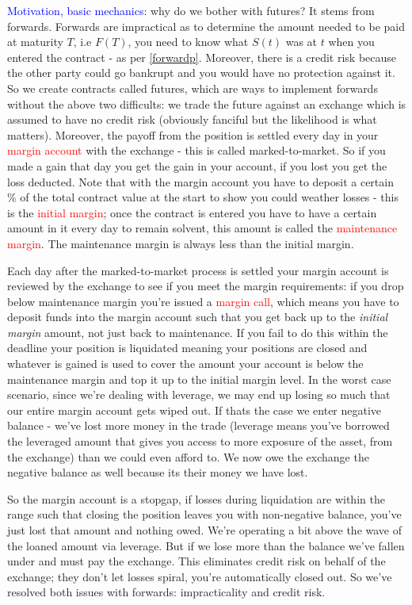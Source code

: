 \documentclass[9pt]{extarticle}
\begin{document}
\textcolor{blue}{Motivation, basic mechanics}: why do we bother with futures? It stems from forwards. Forwards are impractical as to determine the amount needed 
to be paid at maturity $T$, i.e $F(T)$, you need to know what $S(t)$ was at $t$ when you entered the contract - as per \eqref{forwardp}. Moreover, 
there is a credit risk because the other party could go bankrupt and you would have no protection against it. So we create contracts called 
futures, which are ways to implement forwards without the above two difficults: we trade the future against an exchange which is assumed to 
have no credit risk (obviously fanciful but the likelihood is what matters). Moreover, the payoff from the position is settled every day 
in your \textcolor{red}{margin account} with the exchange - this is called marked-to-market. So if you made a gain that day you get the gain in your account, if you lost 
you get the loss deducted. Note that with the margin account you have to deposit a certain \% of the total contract value 
at the start to show you could weather losses - this is the \textcolor{red}{initial margin}; once the contract is entered you have to have a certain amount in it 
every day to remain solvent, this amount is called the \textcolor{red}{maintenance margin}. The maintenance margin is always less than 
the initial margin. 

Each day after the marked-to-market process is settled your margin account is reviewed by the exchange to see 
if you meet the margin requirements: if you drop below maintenance margin you're issued a \textcolor{red}{margin call}, which means 
you have to deposit funds into the margin account such that you get back up to the \textit{initial margin} amount, not just 
back to maintenance. If you fail to do this within the deadline your position is liquidated meaning your positions are closed 
and whatever is gained is used to cover the amount your account is below the maintenance margin and top it up to the initial margin level. In the worst case scenario, since 
we're dealing with leverage, 
we may end up losing so much that our entire margin account gets wiped out. If thats the case we enter negative balance - we've lost more money in the trade (leverage means 
you've borrowed the leveraged amount that gives you access to more exposure of the asset, from the exchange) than we could even afford to. 
We now owe the exchange the negative balance as well because its their money we have lost. 

So the margin account is a stopgap, if losses during liquidation
are within the range such that closing the position leaves you with non-negative balance, you've just lost that amount and nothing owed. We're operating 
a bit above the wave of the loaned amount via leverage. But if we lose more than the balance we've fallen under and must pay the exchange.
This eliminates credit risk on behalf of 
the exchange; they don't let losses spiral, you're automatically closed out. So we've resolved both issues with forwards: impracticality and credit risk.
\end{document}
